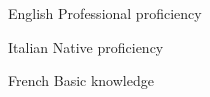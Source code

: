 
\begin{cvskills}

  \cvskill
    {English} %
    {Professional proficiency} %

  \cvskill
    {Italian} %
    {Native proficiency} %

  \cvskill
    {French} %
    {Basic knowledge} %

\end{cvskills}
